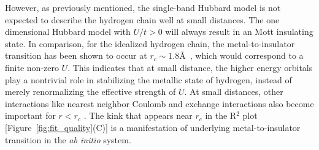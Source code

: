 However, as previously mentioned, the single-band 
Hubbard model is not expected to describe the hydrogen chain well at small distances. 
The one dimensional Hubbard model with $U/t>0$ will always result in 
an Mott insulating state. In comparison, for the idealized hydrogen chain, the 
metal-to-insulator transition has been shown to occur at $r_c \sim 1.8$\AA~\cite{Stella2011}, which would correspond 
to a finite non-zero $U$. This indicates that at small distance, the higher energy orbitals play a nontrivial 
role in stabilizing the metallic state of hydrogen, instead of merely renormalizing the effective strength of $U$. 
At small distances, other interactions like nearest neighbor Coulomb 
and exchange interactions also become important for $r<r_c$ \cite{ZhengThesis}. The kink that appears near $r_c$ in the R$^2$ plot [Figure~\ref{fig:fit_quality}(C)] is a manifestation of underlying metal-to-insulator transition in the \textit{ab initio} system. 
